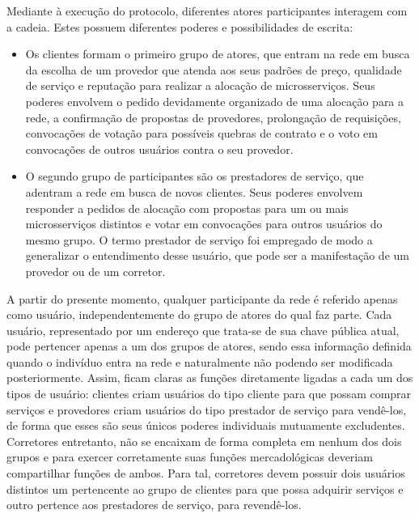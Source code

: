 Mediante à execução do protocolo, diferentes atores participantes interagem com a cadeia. Estes possuem diferentes poderes e possibilidades de escrita:
\begin{itemize}
    \item Os clientes formam o primeiro grupo de atores, que entram na rede em busca da escolha de um provedor que atenda aos seus padrões de preço, qualidade de serviço e reputação para realizar a alocação de microsserviços. Seus poderes envolvem o pedido devidamente organizado de uma alocação para a rede, a confirmação de propostas de provedores, prolongação de requisições, convocações de votação para possíveis quebras de contrato e o voto em convocações de outros usuários contra o seu provedor.
    \item O segundo grupo de participantes são os prestadores de serviço, que adentram a rede em busca de novos clientes. Seus poderes envolvem responder a pedidos de alocação com propostas para um ou mais microsserviços distintos e votar em convocações para outros usuários do mesmo grupo. O termo prestador de serviço foi empregado de modo a generalizar o entendimento desse usuário, que pode ser a manifestação de um provedor ou de um corretor.
\end{itemize}

A partir do presente momento, qualquer participante da rede é referido apenas como usuário, independentemente do grupo de atores do qual faz parte. Cada usuário, representado por um endereço que trata-se de sua chave pública atual, pode pertencer apenas a um dos grupos de atores, sendo essa informação definida quando o indivíduo entra na rede e naturalmente não podendo ser modificada posteriormente. Assim, ficam claras as funções diretamente ligadas a cada um dos tipos de usuário: clientes criam usuários do tipo cliente para que possam comprar serviços e provedores criam usuários do tipo prestador de serviço para vendê-los, de forma que esses são seus únicos poderes individuais mutuamente excludentes. Corretores entretanto, não se encaixam de forma completa em nenhum dos dois grupos e para exercer corretamente suas funções mercadológicas deveriam compartilhar funções de ambos. Para tal, corretores devem possuir dois usuários distintos um pertencente ao grupo de clientes para que possa adquirir serviços e outro pertence aos prestadores de serviço, para revendê-los. 

